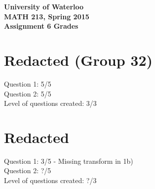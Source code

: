 \documentclass[12pt]{article}
\begin{document}
\begin{center}
{\Large\bf University of Waterloo}\\
\vspace{3mm}
{\Large\bf MATH 213, Spring 2015}\\
\vspace{2mm}
{\Large\bf Assignment 6 Grades}\\
\end{center}

\section*{Redacted (Group 32)}

Question 1: 5/5 \\
Question 2: 5/5 \\

\noindent Level of questions created: 3/3

\section*{Redacted}

Question 1: 3/5 - Missing transform in 1b) \\
Question 2: ?/5 \\

\noindent Level of questions created: ?/3
\end{document}
